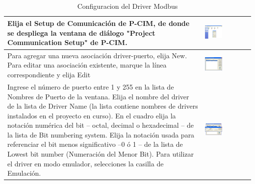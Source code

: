 \begin{itemize}
\begin{table}[!ht]
\begin{tabular}{*{2}{m{}}}
    Elija el Setup de Comunicación de P-CIM, de donde se despliega la ventana 
    de diálogo "Project Communication Setup" de P-CIM.
    &\begin{center}
      \includegraphics[width=0.4\textwidth]
	{Cap5-SCADA/images/SetupPCIM.JPG}
    \end{center}\\
  \hline
    Para agregar una nueva asociación driver-puerto, elija New.
    Para editar una asociación existente, marque la línea correspondiente
    y elija Edit
    &\begin{center}
       \includegraphics[width=0.4\textwidth]
	{Cap5-SCADA/images/commSetup.jpeg}
    \end{center}\\
  \hline
    Ingrese el número de puerto entre 1 y 255 en la lista de Nombres de 
    Puerto de la ventana.
    Elija el nombre del driver de la lista de Driver Name (la lista 
    contiene nombres de drivers instalados en el proyecto en curso).
    En el cuadro elija la notación numérica del bit – octal, decimal o 
    hexadecimal – de la lista de Bit numbering system.
    Elija la notación usada para referenciar el bit menos significativo –0 
    ó 1 – de la lista de Lowest bit number (Numeración del Menor Bit).
    Para utilizar el driver en modo emulador, selecciones la casilla de 
    Emulación.
    &\begin{center}
       \includegraphics[width=0.4\textwidth]
	{Cap5-SCADA/images/portProp.jpeg}
    \end{center}\\
  \hline
  \end{tabular}
  \caption{Configuracion del Driver Modbus}
  \label{tab:ConfigModbus}
  \end{table}
 

\end{itemize}
